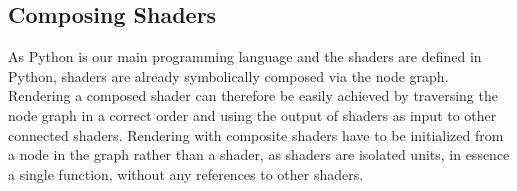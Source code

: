 


    

\subsection{Composing Shaders}

As Python is our main programming language and the shaders are defined in Python, shaders are already symbolically composed via the node graph. Rendering a composed shader can therefore be easily achieved by traversing the node graph in a correct order and using the output of shaders as input to other connected shaders. Rendering with composite shaders have to be initialized from a node in the graph rather than a shader, as shaders are isolated units, in essence a single function, without any references to other shaders.

